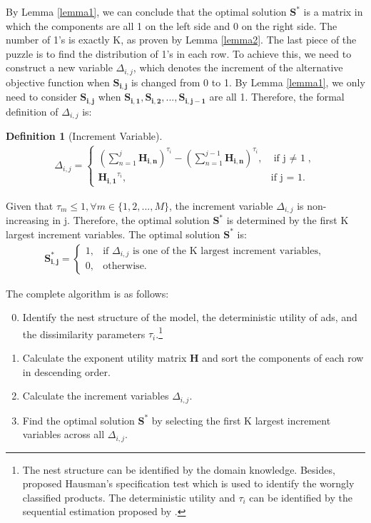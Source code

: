 \documentclass[12pt]{article}
\theoremstyle{definition}
\newtheorem{definition}{Definition}[section]
\newcommand{\matr}[1]{\mathbf{#1}} %
\begin{document}
\begin{sloppypar}
By Lemma \ref{lemma1}, we can conclude that the optimal solution $\matr{S^{\ast}}$ is a matrix in which the components are all 1 on the left side and 0 on the right side. The number of 1's is exactly K, as proven by Lemma \ref{lemma2}. The last piece of the puzzle is to find the distribution of 1's in each row. To achieve this, we need to construct a new variable $\Delta_{i,j}$, which denotes the increment of the alternative objective function when $\matr{S_{i,j}}$ is changed from 0 to 1. By Lemma \ref{lemma1}, we only need to consider $\matr{S_{i,j}}$ when $\matr{S_{i,1}}, \matr{S_{i,2}}, ..., \matr{S_{i,j-1}}$ are all 1. Therefore, the formal definition of $\Delta_{i,j}$ is:
\begin{definition}[Increment Variable]\label{increment}
    \begin{align*}
    \Delta_{i,j} = 
    \begin{cases}
        (\sum\limits_{n=1}^{j} \matr{H_{i,n}})^{\tau_i} - (\sum\limits_{n=1}^{j-1} \matr{H_{i,n}})^{\tau_i}, &\text{if j $\neq$ 1},\\
        \matr{H_{i,1}}^{\tau_i}, &\text{if j = 1}.
    \end{cases}
    \end{align*}
\end{definition}

Given that $\tau_m \leq 1, \forall m \in \{1,2,...,M\}$, the increment variable $\Delta_{i,j}$ is non-increasing in j. Therefore, the optimal solution $\matr{S^{\ast}}$ is determined by the first K largest increment variables. The optimal solution $\matr{S^{\ast}}$ is:
\begin{align}
    \matr{S^{\ast}_{i,j}} = 
    \begin{cases}
        1, &\text{if $\Delta_{i,j}$ is one of the K largest increment variables},\\
        0, &\text{otherwise}.
    \end{cases}
\end{align}

The complete algorithm is as follows:
\begin{enumerate}
    \setcounter{enumi}{-1}
    \item Identify the nest structure of the model, the deterministic utility of ads, and the dissimilarity parameters $\tau_i$.\footnote{The nest structure can be identified by the domain knowledge. Besides, \textcite{hausman1978} proposed Hausman's specification test which is used to identify the worngly classified products. The deterministic utility and $\tau_i$ can be identified by the sequential estimation proposed by \textcite{train}.}
    \item Calculate the exponent utility matrix $\matr{H}$ and sort the components of each row in descending order.
    \item Calculate the increment variables $\Delta_{i,j}$.
    \item Find the optimal solution $\matr{S^{\ast}}$ by selecting the first K largest increment variables across all $\Delta_{i,j}$.
\end{enumerate}


\end{sloppypar}
\end{document}
